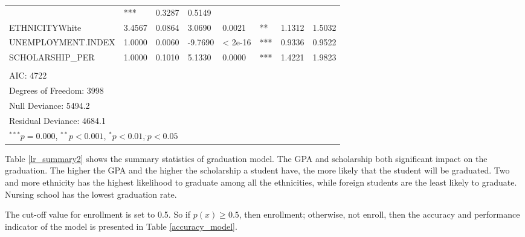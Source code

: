 \documentclass[12pt,english]{report}
\begin{document}
\begin{table}[]
\begin{adjustbox}{width=1.05\textwidth}
\begin{tabular}{llllllll}
& ***         & 0.3287 & 0.5149 \\
ETHNICITYWhite                  & 3.4567   & 0.0864     & 3.0690  & 0.0021     
& **          & 1.1312 & 1.5032 \\
UNEMPLOYMENT.INDEX              & 1.0000   & 0.0060     & -9.7690 & \textless
2e-16     & ***         & 0.9336 & 0.9522 \\
SCHOLARSHIP\_PER                & 1.0000   & 0.1010     & 5.1330  & 0.0000     
& ***         & 1.4221 & 1.9823    \\
\\
AIC: 4722\\
Degrees of Freedom: 3998 \\
Null Deviance:      5494.2 \\
Residual Deviance: 4684.1
\\
\hline
\multicolumn{7}{l}{\scriptsize{$^{***} p=0.000$, $^{**} p<0.001$, $^*
p<0.01$,$^{.}p<0.05$}}

\end{tabular}
\end{adjustbox}
\end{table}


Table \ref{lr_summary2} shows the summary statistics of graduation model. The
GPA and scholarship
both significant impact on the graduation. The higher the GPA and the higher
the scholarship 
a student have, the more likely that the
student will be graduated. Two and more ethnicity has the highest likelihood to
graduate among
all the ethnicities, while foreign students are the least likely to graduate.
Nursing school
has the lowest graduation rate. 

The cut-off value for enrollment is set to 0.5. So if  $p(x) \geq 0.5$, then
enrollment; 
otherwise, not enroll, then the accuracy and performance indicator of the model
is
presented in Table \ref{accuracy_model}.   

\end{document}
